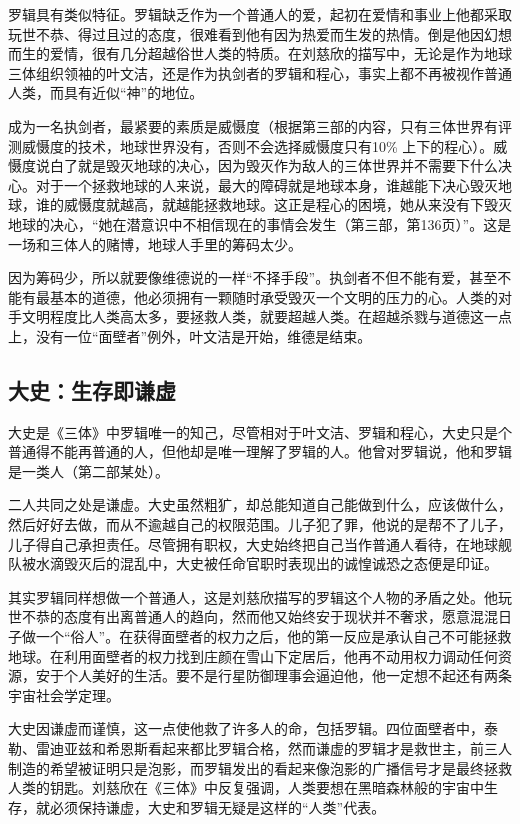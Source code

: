 \documentclass[openany,scheme = chinese, linespread = 1.5]{ctexbook}
\begin{document}
罗辑具有类似特征。罗辑缺乏作为一个普通人的爱，起初在爱情和事业上他都采取玩世不恭、得过且过的态度，很难看到他有因为热爱而生发的热情。倒是他因幻想而生的爱情，很有几分超越俗世人类的特质。在刘慈欣的描写中，无论是作为地球三体组织领袖的叶文洁，还是作为执剑者的罗辑和程心，事实上都不再被视作普通人类，而具有近似“神”的地位。

成为一名执剑者，最紧要的素质是威慑度（根据第三部的内容，只有三体世界有评测威慑度的技术，地球世界没有，否则不会选择威慑度只有10\% 上下的程心）。威慑度说白了就是毁灭地球的决心，因为毁灭作为敌人的三体世界并不需要下什么决心。对于一个拯救地球的人来说，最大的障碍就是地球本身，谁越能下决心毁灭地球，谁的威慑度就越高，就越能拯救地球。这正是程心的困境，她从来没有下毁灭地球的决心，“她在潜意识中不相信现在的事情会发生（第三部，第136页）”。这是一场和三体人的赌博，地球人手里的筹码太少。

因为筹码少，所以就要像维德说的一样“不择手段”。执剑者不但不能有爱，甚至不能有最基本的道德，他必须拥有一颗随时承受毁灭一个文明的压力的心。人类的对手文明程度比人类高太多，要拯救人类，就要超越人类。在超越杀戮与道德这一点上，没有一位“面壁者”例外，叶文洁是开始，维德是结束。

\subsection*{大史：生存即谦虚}

大史是《三体》中罗辑唯一的知己，尽管相对于叶文洁、罗辑和程心，大史只是个普通得不能再普通的人，但他却是唯一理解了罗辑的人。他曾对罗辑说，他和罗辑是一类人（第二部某处）。

二人共同之处是谦虚。大史虽然粗犷，却总能知道自己能做到什么，应该做什么，然后好好去做，而从不逾越自己的权限范围。儿子犯了罪，他说的是帮不了儿子，儿子得自己承担责任。尽管拥有职权，大史始终把自己当作普通人看待，在地球舰队被水滴毁灭后的混乱中，大史被任命官职时表现出的诚惶诚恐之态便是印证。

其实罗辑同样想做一个普通人，这是刘慈欣描写的罗辑这个人物的矛盾之处。他玩世不恭的态度有出离普通人的趋向，然而他又始终安于现状并不奢求，愿意混混日子做一个“俗人”。在获得面壁者的权力之后，他的第一反应是承认自己不可能拯救地球。在利用面壁者的权力找到庄颜在雪山下定居后，他再不动用权力调动任何资源，安于个人美好的生活。要不是行星防御理事会逼迫他，他一定想不起还有两条宇宙社会学定理。

大史因谦虚而谨慎，这一点使他救了许多人的命，包括罗辑。四位面壁者中，泰勒、雷迪亚兹和希恩斯看起来都比罗辑合格，然而谦虚的罗辑才是救世主，前三人制造的希望被证明只是泡影，而罗辑发出的看起来像泡影的广播信号才是最终拯救人类的钥匙。刘慈欣在《三体》中反复强调，人类要想在黑暗森林般的宇宙中生存，就必须保持谦虚，大史和罗辑无疑是这样的“人类”代表。
\end{document}
